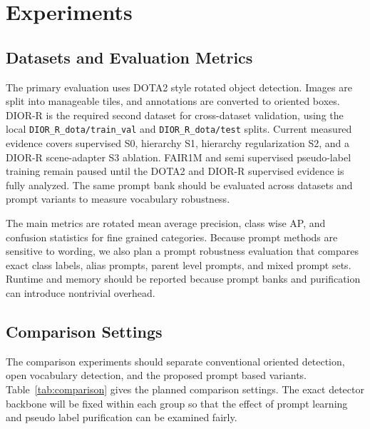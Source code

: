 \documentclass[10pt]{article}
\begin{document}
\section{Experiments}

\subsection{Datasets and Evaluation Metrics}

The primary evaluation uses DOTA2 style rotated object detection. Images are split into manageable tiles, and annotations are converted to oriented boxes. DIOR-R is the required second dataset for cross-dataset validation, using the local \texttt{DIOR\_R\_dota/train\_val} and \texttt{DIOR\_R\_dota/test} splits. Current measured evidence covers supervised S0, hierarchy S1, hierarchy regularization S2, and a DIOR-R scene-adapter S3 ablation. FAIR1M and semi supervised pseudo-label training remain paused until the DOTA2 and DIOR-R supervised evidence is fully analyzed. The same prompt bank should be evaluated across datasets and prompt variants to measure vocabulary robustness.

The main metrics are rotated mean average precision, class wise AP, and confusion statistics for fine grained categories. Because prompt methods are sensitive to wording, we also plan a prompt robustness evaluation that compares exact class labels, alias prompts, parent level prompts, and mixed prompt sets. Runtime and memory should be reported because prompt banks and purification can introduce nontrivial overhead.

\subsection{Comparison Settings}

The comparison experiments should separate conventional oriented detection, open vocabulary detection, and the proposed prompt based variants. Table~\ref{tab:comparison} gives the planned comparison settings. The exact detector backbone will be fixed within each group so that the effect of prompt learning and pseudo label purification can be examined fairly.
\end{document}
